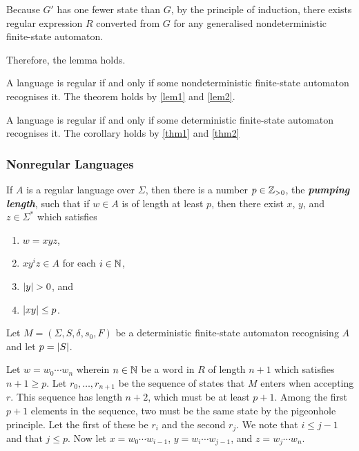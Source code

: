     Because \(G'\) has one fewer state than \(G\), by the principle of
    induction, there exists regular expression \(R\) converted from \(G\) for
    any generalised nondeterministic finite-state automaton.

    Therefore, the lemma holds.
\Epr

\Bth
    \label{thm2}
    A language is regular if and only if some nondeterministic finite-state
    automaton recognises it.
\Eth
\Bpr
    The theorem holds by \autoref{lem1} and \autoref{lem2}.
\Epr

\Bcr
    A language is regular if and only if some deterministic finite-state
    automaton recognises it.
\Ecr
\Bpr
    The corollary holds by \autoref{thm1} and \autoref{thm2}
\Epr

\subsubsection{Nonregular Languages}

    If \(A\) is a regular language over \(\Sigma\), then there is a number \(p
    \in \mathbb{Z}_{>0}\), the \textbf{\textit{pumping length}}, such that if \(w \in
    A\) is of length at least \(p\), then there exist \(x\), \(y\), and \(z \in
    \Sigma^*\) which satisfies
    \begin{enumerate}
        \item \(w = x y z\),
        \item \(x y^i z \in A\) for each \(i \in \mathbb{N}\),
        \item \(\lvert y\rvert > 0\), and
        \item \(\lvert x y \rvert \leq p\).
    \end{enumerate}
\Eth
\Bpr
    Let \(M = (\Sigma, S, \delta, s_0, F)\) be a deterministic finite-state
    automaton recognising \(A\) and let \(p = \lvert S\rvert\).

    Let \(w = w_0 \cdots w_n\) wherein \(n \in \mathbb{N}\) be a word in \(R\) of
    length \(n + 1\) which satisfies \(n + 1 \geq p\). Let \(r_0, \ldots, r_{n +
    1}\) be the sequence of states that \(M\) enters when accepting \(r\). This
    sequence has length \(n + 2\), which must be at least \(p + 1\). Among the
    first \(p + 1\) elements in the sequence, two must be the same state by the
    pigeonhole principle. Let the first of these be \(r_i\) and the second
    \(r_j\). We note that \(i \leq j - 1\) and that \(j \leq p\). Now let \(x =
    w_0 \cdots w_{i - 1}\), \(y = w_i \cdots w_{j - 1}\), and \(z = w_j \cdots
    w_n\).


